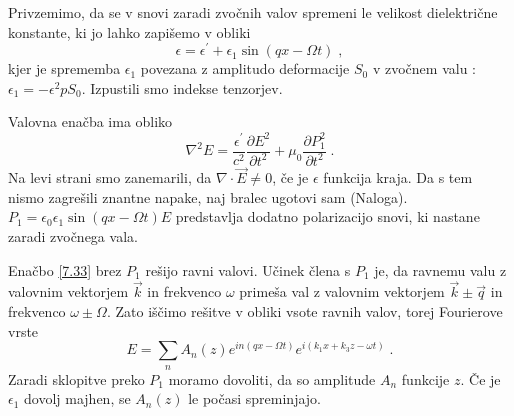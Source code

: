 Privzemimo, da se v snovi zaradi zvočnih valov spremeni le velikost
dielektrične konstante, ki jo lahko zapišemo v obliki 
\begin{equation}
\epsilon=\epsilon^{\prime}+\epsilon_{1}\sin(qx-\Omega t)\;,\label{7.33}
\end{equation}
 kjer je sprememba $\epsilon_{1}$ povezana z amplitudo deformacije
$S_{0}$ v zvočnem valu :$\epsilon_{1}=-\epsilon^{2}pS_{0}$. Izpustili
smo indekse tenzorjev.

Valovna enačba ima obliko 
\begin{equation}
\nabla^{2}E=\frac{\epsilon^{\prime}}{c^{2}}{\frac{\partial E^{2}}{\partial t^{2}}}+\mu_{0}{\frac{\partial P_{1}^{2}}{\partial t^{2}}}\;.\label{7.33}
\end{equation}
 Na levi strani smo zanemarili, da $\nabla\cdot\vec{E}\ne0$, če je
$\epsilon$ funkcija kraja. Da s tem nismo zagrešili znantne napake,
naj bralec ugotovi sam (Naloga). $P_{1}=\epsilon_{0}\epsilon_{1}\sin(qx-\Omega t)E$
predstavlja dodatno polarizacijo snovi, ki nastane zaradi zvočnega
vala.

Enačbo \ref{7.33} brez $P_{1}$ rešijo ravni valovi. Učinek člena
s $P_{1}$ je, da ravnemu valu z valovnim vektorjem $\vec{k}$ in
frekvenco $\omega$ primeša val z valovnim vektorjem $\vec{k}\pm\vec{q}$
in frekvenco $\omega\pm\Omega$. Zato iščimo rešitve v obliki vsote
ravnih valov, torej Fourierove vrste 
\begin{equation}
E=\sum_{n}A_{n}(z)e^{in(qx-\Omega t)}e^{i(k_{1}x+k_{3}z-\omega t)}\;.\label{7.34}
\end{equation}
 Zaradi sklopitve preko $P_{1}$ moramo dovoliti, da so amplitude
$A_{n}$ funkcije $z$. Če je $\epsilon_{1}$ dovolj majhen, se $A_{n}(z)$
le počasi spreminjajo.

